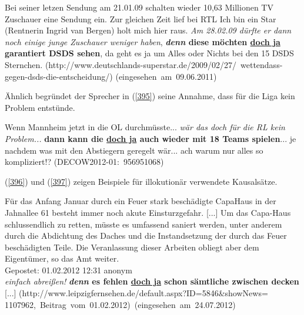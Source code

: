 \begin{exe}
	\ex\label{394}
	\scriptsize
	Bei seiner letzen Sendung am 21.01.09 schalten wieder 10,63 Millionen TV  Zuschauer eine Sendung ein. Zur gleichen Zeit lief bei RTL \glqq Ich bin ein 	Star (Rentnerin \glqq Ingrid van Bergen\grqq{}) holt mich hier raus\grqq{}. \emph{Am 28.02.09 dürfte er dann noch einige junge Zuschauer weniger haben}, 		\textbf{\textit{denn} diese möchten \underline{doch ja} garantiert DSDS sehen}, da geht es ja um \glqq Alles oder Nichts\grqq{} bei den 15 DSDS 				Sternchen. 	
	\newline
	\hbox{}\hfill\hbox{(http://www.deutschlands-superstar.de/2009/02/27/                                                                                     	wettendass-gegen-dsds-die-entscheidung/)}	
	\newline
	\hbox{}\hfill\hbox{(eingesehen am 09.06.2011)}
	\newline
	\hbox{}\hfill\hbox{\citet[176]{Mueller2014a}}
\end{exe}        
Ähnlich begründet der Sprecher in (\ref{395}) seine Annahme, dass für die Liga kein Problem entstünde.

\begin{exe}
	\ex\label{395}
	\scriptsize
	Wenn Mannheim jetzt in die OL durchmüsste... \emph{wär das doch für die RL kein Problem...} \textbf{dann kann die \underline{doch ja} auch wieder mit 		18 Teams spielen}... je nachdem was mit den Abstiegern geregelt wär... ach warum nur alles so kompliziert!? 	
	\hfill\hbox{(DECOW2012-01: 956951068)}
\end{exe} 
(\ref{396}) und (\ref{397}) zeigen Beispiele für illokutionär  verwendete Kausalsätze.
 
\begin{exe}
	\ex\label{396}
	\scriptsize
	Für das Anfang Januar durch ein Feuer stark beschädigte CapaHaus in der Jahnallee 61 besteht immer noch akute Einsturzgefahr. [...] 
	Um das Capa-Haus schlussendlich zu retten, müsste es umfassend saniert werden, unter anderem durch die Abdichtung des Daches und die Instandsetzung 		der durch das Feuer beschädigten Teile. Die Veranlassung dieser Arbeiten obliegt aber dem Eigentümer, so das Amt weiter.\\
	Gepostet: 01.02.2012 12:31 anonym\\
	\emph{einfach abreißen!} 
	\textbf{\textit{denn} es fehlen \underline{doch ja} schon sämtliche zwischen decken} [...] 		
	\newline
	\hbox{}\hfill\hbox{(http://www.leipzigfernsehen.de/default.aspx?ID=5846\&showNews=}	
	\newline
	\hbox{}\hfill\hbox{1107962, Beitrag vom 01.02.2012) (eingesehen am 24.07.2012)}
	\newline
	\hbox{}\hfill\hbox{\citet[176]{Mueller2014a}}
\end{exe}        

